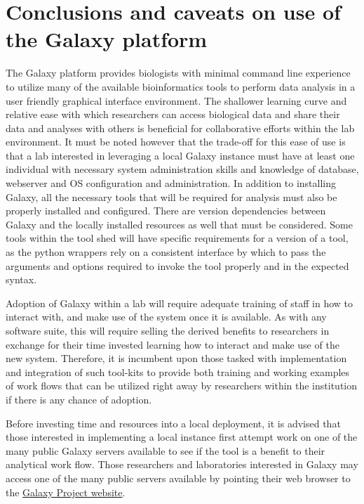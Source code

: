 \documentclass[a4paper,10pt]{article}
\begin{document}
\section{Conclusions and caveats on use of the Galaxy platform}
The Galaxy platform provides biologists with minimal command line experience to utilize many of the available bioinformatics tools to perform data analysis in a user friendly graphical interface environment.  The shallower learning curve and relative ease with which researchers can access biological data and share their data and analyses with others is beneficial for collaborative efforts within the lab environment.  It must be noted however that the trade-off for this ease of use is that a lab interested in leveraging a local Galaxy instance must have at least one individual with necessary system administration skills and knowledge of database, webserver and OS configuration and administration.  In addition to installing Galaxy, all the necessary tools that will be required for analysis must also be properly installed and configured.  There are version dependencies between Galaxy and the locally installed resources as well that must be considered.  Some tools within the tool shed will have specific requirements for a version of a tool, as the python wrappers rely on a consistent interface by which to pass the arguments and options required to invoke the tool properly and in the expected syntax.

Adoption of Galaxy within a lab will require adequate training of staff in how to interact with, and make use of the system once it is available.  As with any software suite, this will require selling the derived benefits to researchers in exchange for their time invested learning how to interact and make use of the new system.  Therefore, it is incumbent upon those tasked with implementation and integration of such tool-kits to provide both training and working examples of work flows that can be utilized right away by researchers within the institution if there is any chance of adoption.

Before investing time and resources into a local deployment, it is advised that those interested in implementing a local instance first attempt work on one of the many public Galaxy servers available to see if the tool is a benefit to their analytical work flow.  Those researchers and laboratories interested in Galaxy may access one of the many public servers available by pointing their web browser to the \href{https://galaxyproject.org/}{Galaxy Project website}.  
\end{document}
